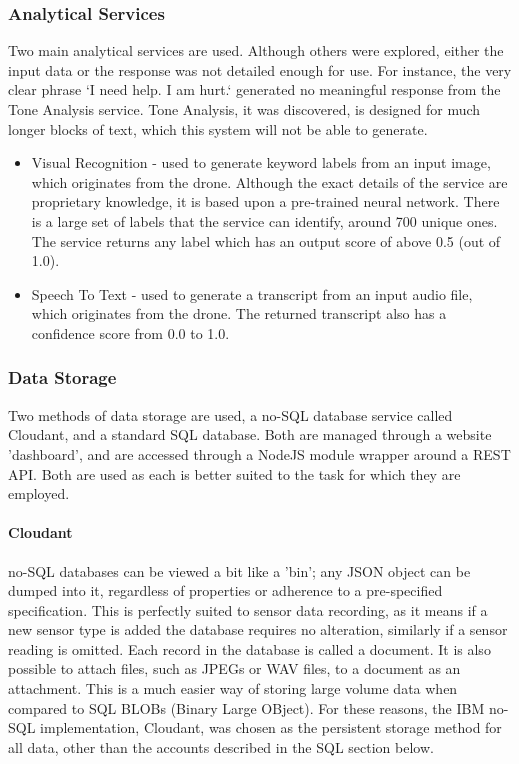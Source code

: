 \documentclass{article}
\begin{document}
\subsubsection{Analytical Services}\label{AnalyticalServices}
Two main analytical services are used. Although others were explored, either the input data or the response was not detailed enough for use. For instance, the very clear phrase `I need help. I am hurt.` generated no meaningful response from the Tone Analysis service. Tone Analysis, it was discovered, is designed for much longer blocks of text, which this system will not be able to generate.
\begin{itemize}
	\item Visual Recognition - used to generate keyword labels from an input image, which originates from the drone. Although the exact details of the service are proprietary knowledge, it is based upon a pre-trained neural network. There is a large set of labels that the service can identify, around 700 unique ones. The service returns any label which has an output score of above 0.5 (out of 1.0). 
	\item Speech To Text - used to generate a transcript from an input audio file, which originates from the drone. The returned transcript also has a confidence score from 0.0 to 1.0. 
\end{itemize}

\subsubsection{Data Storage}
Two methods of data storage are used, a no-SQL database service called Cloudant, and a standard SQL database. Both are managed through a website 'dashboard', and are accessed through a NodeJS module wrapper around a REST API. Both are used as each is better suited to the task for which they are employed.
\paragraph{Cloudant}
no-SQL databases can be viewed a bit like a 'bin'; any JSON object can be dumped into it, regardless of properties or adherence to a pre-specified specification. This is perfectly suited to sensor data recording, as it means if a new sensor type is added the database requires no alteration, similarly if a sensor reading is omitted. Each record in the database is called a document. It is also possible to attach files, such as JPEGs or WAV files, to a document as an attachment. This is a much easier way of storing large volume data when compared to SQL BLOBs (Binary Large OBject). For these reasons, the IBM no-SQL implementation, Cloudant, was chosen as the persistent storage method for all data, other than the accounts described in the SQL section below. 
\end{document}
